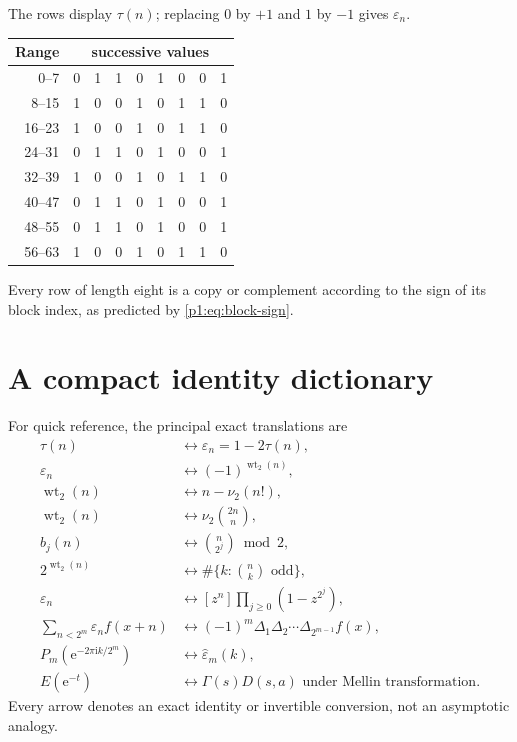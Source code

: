 \documentclass[11pt,oneside]{article}
\numberwithin{equation}{section}
\theoremstyle{definition}
\theoremstyle{remark}
\newcommand{\e}{\mathrm e}
\newcommand{\ii}{\mathrm i}
\newcommand{\wt}{\operatorname{wt}_2}
\newcommand{\vtwo}{\nu_2}
\newcommand{\eps}{\varepsilon}
\begin{document}
The rows display \(\tau(n)\); replacing \(0\) by \(+1\) and \(1\) by
\(-1\) gives \(\eps_n\).

\begin{center}
\small
\begin{longtable}{@{}r|*{8}{c}@{}}
\toprule
Range & \multicolumn{8}{c}{successive values}\\
\midrule
\endhead
0--7   & 0&1&1&0&1&0&0&1\\
8--15  & 1&0&0&1&0&1&1&0\\
16--23 & 1&0&0&1&0&1&1&0\\
24--31 & 0&1&1&0&1&0&0&1\\
32--39 & 1&0&0&1&0&1&1&0\\
40--47 & 0&1&1&0&1&0&0&1\\
48--55 & 0&1&1&0&1&0&0&1\\
56--63 & 1&0&0&1&0&1&1&0\\
\bottomrule
\end{longtable}
\end{center}

Every row of length eight is a copy or complement according to the sign of its
block index, as predicted by \eqref{p1:eq:block-sign}.

\section[Identity dictionary]{A compact identity dictionary}
\label{p1:app:identity-dictionary}

For quick reference, the principal exact translations are
\begin{align*}
 \tau(n)
 &\longleftrightarrow \eps_n=1-2\tau(n),\\
 \eps_n
 &\longleftrightarrow (-1)^{\wt(n)},\\
 \wt(n)
 &\longleftrightarrow n-\vtwo(n!),\\
 \wt(n)
 &\longleftrightarrow \vtwo\binom{2n}{n},\\
 b_j(n)
 &\longleftrightarrow \binom{n}{2^j}\bmod2,\\
 2^{\wt(n)}
 &\longleftrightarrow \#\{k:\binom nk\text{ odd}\},\\
 \eps_n
 &\longleftrightarrow [z^n]\prod_{j\ge0}(1-z^{2^j}),\\
 \sum_{n<2^m}\eps_nf(x+n)
 &\longleftrightarrow (-1)^m\Delta_1\Delta_2\cdots
   \Delta_{2^{m-1}}f(x),\\
 P_m(\e^{-2\pi\ii k/2^m})
 &\longleftrightarrow \widehat\eps_m(k),\\
 E(\e^{-t})
 &\longleftrightarrow \Gamma(s)D(s,a)
  \text{ under Mellin transformation}.
\end{align*}
Every arrow denotes an exact identity or invertible conversion, not an
asymptotic analogy.
\end{document}
